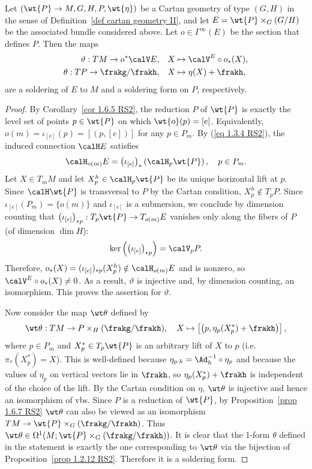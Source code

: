 \begin{prop}
    Let $(\wt{P}\to M,G,H,P,\wt{\eta})$ be a Cartan geometry of type $(G,H)$ in the sense of Definition~\ref{def cartan geometry II}, and let $E=\wt{P}\times_G (G\slash H)$ be the associated bundle considered above. Let $o\in\Gamma^\infty(E)$ be the section that defines $P$. Then the maps
    \begin{align}
        \vartheta: TM\to o^\ast\calV E,\quad &X\mapsto \calV^E\circ o_\ast(X),\\
        \theta:TP\to \frakg\slash\frakh, \quad &X\mapsto \eta(X)+\frakh,
    \end{align}
    are a soldering of $E$ to $M$ and a soldering form on $P$, respectively.
\end{prop}
\begin{proof}
    By Corollary~\ref{cor 1.6.5 RS2}, the reduction $P$ of $\wt{P}$ is exactly the level set of points $p\in\wt{P}$ on which $\wt{o}(p)=[e]$. Equivalently, $o(m)=\iota_{[e]}(p)=[(p,[e])]$ for any $p\in P_m$. By (\ref{eq 1.3.4 RS2}), the induced connection $\calH E$ satisfies 
    \[\calH_{o(m)}E=\left(\iota_{[e]}\right)_\ast\left(\calH_p \wt{P}\right),\quad p\in P_m.\]
    Let $X\in T_mM$ and let $X^h_p\in \calH_p \wt{P}$ be its unique horizontal lift at $p$. Since $\calH \wt{P}$ is transversal to $P$ by the Cartan condition, $X^h_p\notin T_p P$. Since $\iota_{[e]}(P_m)=\{o(m)\}$ and $\iota_{[e]}$ is a submersion, we conclude by dimension counting that $\left(\iota_{[e]}\right)_{\ast p}:T_p\wt{P}\to T_{o(m)}E$ vanishes only along the fibers of $P$ (of dimension $\dim H$):
    \[\ker\left(\left(\iota_{[e]}\right)_{\ast p}\right)=\calV_p P.\]
    Therefore, $o_\ast(X)=(\iota_{[e]})_{\ast p}(X_p^h)\notin \calH_{o(m)}E$ and is nonzero, so $\calV^E\circ o_\ast(X)\neq 0$. As a result, $\vartheta$ is injective and, by dimension counting, an isomorphism. This proves the assertion for $\vartheta$.

    Now consider the map $\wt\theta$ defined by 
    \[\wt\theta:TM\to P\times_H (\frakg\slash\frakh),\quad X\mapsto \left[\left(p,\eta_p(X^\ast_p)+\frakh\right)\right],\]
    where $p\in P_m$ and $X^\ast_p\in T_p\wt{P}$ is an arbitrary lift of $X$ to $p$ (i.e.\ $\pi_\ast(X^\ast_p)=X$). This is well-defined because $\eta_{p\cdot h}=\Ad_h^{-1}\circ\eta_p$ and because the values of $\eta_p$ on vertical vectors lie in $\frakh$, so $\eta_p(X^\ast_p)+\frakh$ is independent of the choice of the lift. By the Cartan condition on $\eta$, $\wt\theta$ is injective and hence an isomorphism of \glspl{vb}. Since $P$ is a reduction of $\wt{P}$, by Proposition~\ref{prop 1.6.7 RS2} $\wt\theta$ can also be viewed as an isomorphism $TM\to \wt{P}\times_G (\frakg\slash\frakh)$. Thus $\wt\theta\in\Omega^1(M;\wt{P}\times_G (\frakg\slash\frakh))$. It is clear that the 1-form $\theta$ defined in the statement is exactly the one corresponding to $\wt\theta$ via the bijection of Proposition~\ref{prop 1.2.12 RS2}. Therefore it is a soldering form.
\end{proof}

